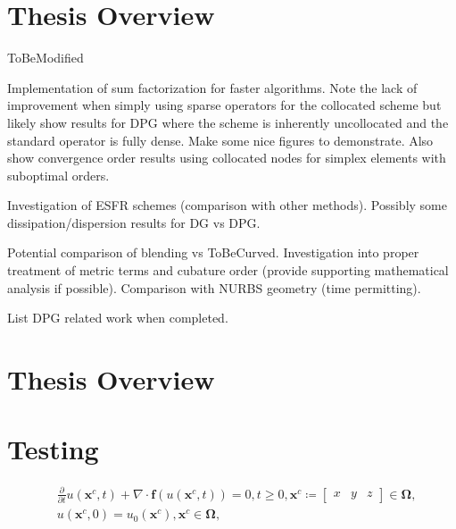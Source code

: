 \documentclass[12pt,Bold,letterpaper,TexShade]{mcgilletdclass}
\numberwithin{equation}{section}
\begin{document}
\section{Thesis Overview}
{\color{red} ToBeModified}

Implementation of sum factorization for faster algorithms. Note the lack of improvement when simply using sparse operators for the collocated scheme but likely show results for DPG where the scheme is inherently uncollocated and the standard operator is fully dense. Make some nice figures to demonstrate. Also show convergence order results using collocated nodes for simplex elements with suboptimal orders.

Investigation of ESFR schemes (comparison with other methods). Possibly some dissipation/dispersion results for DG vs DPG.

Potential comparison of blending vs ToBeCurved. Investigation into proper treatment of metric terms and cubature order (provide supporting mathematical analysis if possible). Comparison with NURBS geometry (time permitting).

{\color{red} List DPG related work when completed.}

\section{Thesis Overview}

\section{Testing}
\label{sec:NumericalResults}


\begin{equation} \nonumber
\begin{split}
& \frac{\partial}{\partial t} u(\boldsymbol x^{c},t) + \nabla \cdot \boldsymbol f(u(\boldsymbol x^{c},t)) = 0, t \ge 0, 
\boldsymbol x^{c} \coloneqq
\begin{bmatrix} x & y & z \end{bmatrix} \in \boldsymbol \Omega, \\
& u(\boldsymbol x^{c},0) = u_0(\boldsymbol x^{c}), \boldsymbol x^{c} \in \boldsymbol \Omega,
\end{split}
\end{equation}
\end{document}
